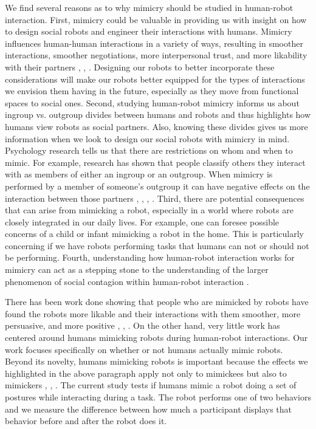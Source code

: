 \documentclass{acm_proc_article-sp}
\begin{document}
We find several reasons as to why mimicry should be studied in human-robot interaction. First, mimicry could be valuable in providing us with insight on how to design social robots and engineer their interactions with humans. Mimicry influences human-human interactions in a variety of ways, resulting in smoother interactions, smoother negotiations, more interpersonal trust, and more likability with their partners \cite{maddux2008chameleons}, \cite{stel2010mimicry}, \cite{swaab2011early}. Designing our robots to better incorporate these considerations will make our robots better equipped for the types of interactions we envision them having in the future, especially as they move from functional spaces to social ones. Second, studying human-robot mimicry informs us about ingroup vs. outgroup divides between humans and robots and thus highlights how humans view robots as social partners. Also, knowing these divides gives us more information when we look to design our social robots with mimicry in mind. Psychology research tells us that there are restrictions on whom and when to mimic. For example, research has shown that people classify others they interact with as members of either an ingroup or an outgroup. When mimicry is performed by a member of someone's outgroup it can have negative effects on the interaction between those partners \cite{bourgeois2008impact}, \cite{chartrand2013antecedents}, \cite{kavanagh2011s}, \cite{yabar2006implicit}. Third, there are potential consequences that can arise from mimicking a robot, especially in a world where robots are closely integrated in our daily lives. For example, one can foresee possible concerns of a child or infant mimicking a robot in the home. This is particularly concerning if we have robots performing tasks that humans can not or should not be performing. Fourth, understanding how human-robot interaction works for mimicry can act as a stepping stone to the understanding of the larger phenomenon of social contagion within human-robot interaction \cite{chartrand2013antecedents}.

There has been work done showing that people who are mimicked by robots have found the robots more likable and their interactions with them smoother, more persuasive, and more positive \cite{bailenson2005digital}, \cite{chartrand2013antecedents}, \cite{riek2010my}. On the other hand, very little work has centered around humans mimicking robots during human-robot interactions. Our work focuses specifically on whether or not humans actually mimic robots. Beyond its novelty, humans mimicking robots is important because the effects we highlighted in the above paragraph apply not only to mimickees but also to mimickers \cite{maddux2008chameleons}, \cite{stel2010mimicry}, \cite{swaab2011early}. The current study tests if humans mimic a robot doing a set of postures while interacting during a task. The robot performs one of two behaviors and we measure the difference between how much a participant displays that behavior before and after the robot does it.  
\end{document}
